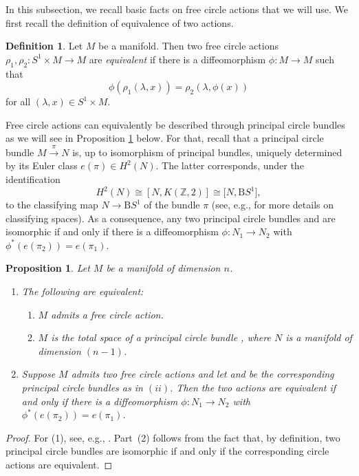 \documentclass[10pt,a4paper]{amsart}
\numberwithin{equation}{section}
\newtheorem{Proposition}[Theorem]{Proposition}
\theoremstyle{definition}
\newtheorem{Definition}[Theorem]{Definition}
\numberwithin{table}{section}
\newcommand{\Z}{\mathbb{Z}}
\begin{document}
In this subsection, we recall basic facts on free circle actions that we will use. We first recall the definition of equivalence of two actions.

\begin{Definition}
	Let $M$ be a manifold. Then two free circle actions $\rho_1,\rho_2\colon S^1\times M\to M$ are \emph{equivalent} if there is a diffeomorphism $\phi\colon M\to M$ such that
	\[ \phi(\rho_1(\lambda,x))=\rho_2(\lambda,\phi(x)) \]
	for all $(\lambda,x)\in S^1\times M$.
\end{Definition}

Free circle actions can equivalently be described through principal circle bundles as we will see in Proposition \ref{P:action=bdl} below. For that, recall that a principal circle bundle $M\xrightarrow{\pi}N$ is, up to isomorphism of principal bundles, uniquely determined by its Euler class $e(\pi)\in H^2(N)$. The latter corresponds, under the identification
\[H^2(N)\cong[N,K(\Z,2)]\cong \bigl[N,\mathrm{B}S^1\bigr],\]
to the classifying map $N\to \mathrm{B}S^1$ of the bundle $\pi$ (see, e.g., \cite[Sections 4.10--4.13]{Hu94} for more details on classifying spaces). As a consequence, any two principal circle bundles  and  are isomorphic if and only if there is a diffeomorphism $\phi\colon N_1\to N_2$ with ${\phi^*(e(\pi_2))=e(\pi_1)}$.

\begin{Proposition}\label{P:action=bdl}
	Let $M$ be a manifold of dimension $n$.
	\begin{enumerate}\itemsep=0pt
		\item[$(1)$] The following are equivalent:
		\begin{enumerate}[$(i)$]\itemsep=0pt
			\item $M$ admits a free circle action.
			\item $M$ is the total space of a principal circle bundle , where $N$ is a manifold of dimension $(n-1)$.
		\end{enumerate}
		\item[$(2)$] Suppose $M$ admits two free circle actions and let  and  be the corresponding principal circle bundles as in $(ii)$. Then the two actions are equivalent if and only if there is a diffeomorphism $\phi\colon N_1\to N_2$ with $\phi^*(e(\pi_2))=e(\pi_1)$.
	\end{enumerate}
\end{Proposition}
\begin{proof}
	For (1), see, e.g., \cite[Corollary~VI.2.5]{Br72a}. Part~(2) follows from the fact that, by definition, two principal circle bundles are isomorphic if and only if the corresponding circle actions are equivalent.
\end{proof}
\end{document}
